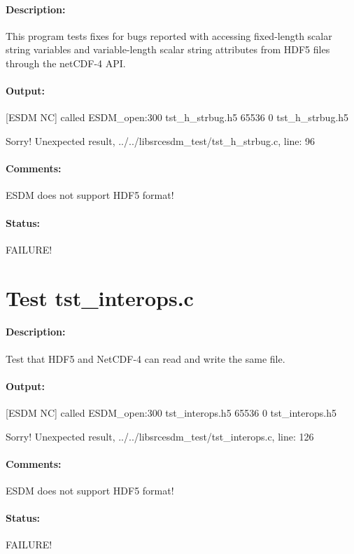 \paragraph{Description:} This program tests fixes for bugs reported with accessing fixed-length scalar string variables and variable-length scalar string attributes from HDF5 files through the netCDF-4 API.

\paragraph{Output:} [ESDM NC] called ESDM\_open:300 tst\_h\_strbug.h5 65536 0 tst\_h\_strbug.h5

Sorry! Unexpected result, ../../libsrcesdm\_test/tst\_h\_strbug.c, line: 96

\paragraph{Comments:} ESDM does not support HDF5 format!

\paragraph{Status:} FAILURE!

\section{Test tst\_interops.c}

\paragraph{Description:} Test that HDF5 and NetCDF-4 can read and write the same file.

\paragraph{Output:} [ESDM NC] called ESDM\_open:300 tst\_interops.h5 65536 0 tst\_interops.h5

Sorry! Unexpected result, ../../libsrcesdm\_test/tst\_interops.c, line: 126

\paragraph{Comments:} ESDM does not support HDF5 format!

\paragraph{Status:} FAILURE!

